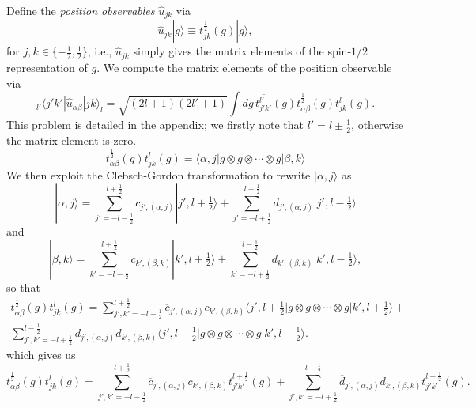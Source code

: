 \documentclass[12pt]{amsart}
\theoremstyle{definition}
\theoremstyle{remark}
\numberwithin{equation}{section}
\begin{document}
Define the \emph{position observables} $\widehat{u}_{jk}$ via
\begin{equation}
	\widehat{u}_{jk}|g\rangle \equiv t_{jk}^{\frac12}(g)|g\rangle,
\end{equation} 
for $j,k \in \{-\frac12, \frac12\}$, i.e., $\widehat{u}_{jk}$ simply gives the matrix elements of the spin-$1/2$ representation of $g$. We compute the matrix elements of the position observable via
\begin{equation}
	_{l'}\langle j'k'|\widehat{u}_{\alpha\beta}|jk\rangle_{l} = \sqrt{(2l+1)(2l'+1)}\int dg\, \overline{t^{l'}_{j'k'}}(g)t_{\alpha\beta}^{\frac12}(g) t_{jk}^{l}(g).
\end{equation}
This problem is detailed in the appendix; we firstly note that $l' = l\pm \frac12$, otherwise the matrix element is zero. 
\begin{equation}
	t_{\alpha\beta}^{\frac12}(g) t_{jk}^{l}(g) = \langle \alpha,j| g\otimes g \otimes \cdots \otimes g|\beta,k\rangle
\end{equation}
We then exploit the Clebsch-Gordon transformation to rewrite $|\alpha,j\rangle$ as
\begin{equation}
	|\alpha,j\rangle = \sum_{j' = -l-\frac12}^{l+\frac12} c_{j',(\alpha,j)} |j',l+\tfrac12\rangle + \sum_{j' = -l+\frac12}^{l-\frac12} d_{j',(\alpha,j)} |j',l-\tfrac12\rangle
\end{equation}
and
\begin{equation}
	|\beta,k\rangle = \sum_{k' = -l-\frac12}^{l+\frac12} c_{k',(\beta,k)} |k',l+\tfrac12\rangle + \sum_{k' = -l+\frac12}^{l-\frac12} d_{k',(\beta,k)} |k',l-\tfrac12\rangle,
\end{equation}
so that
\begin{multline}
		t_{\alpha\beta}^{\frac12}(g) t_{jk}^{l}(g) = \sum_{j',k' = -l-\frac12}^{l+\frac12} \overline{c}_{j',(\alpha,j)}c_{k',(\beta,k)} \langle j',l+\tfrac12| g \otimes g \otimes \cdots \otimes g |k',l+\tfrac12\rangle + \\
		\sum_{j',k' = -l+\frac12}^{l-\frac12} \overline{d}_{j',(\alpha,j)}d_{k',(\beta,k)} \langle j',l-\tfrac12|g \otimes g \otimes \cdots \otimes g|k',l-\tfrac12\rangle.
\end{multline}
which gives us
\begin{equation}
		t_{\alpha\beta}^{\frac12}(g) t_{jk}^{l}(g) = \sum_{j',k' = -l-\frac12}^{l+\frac12} \overline{c}_{j',(\alpha,j)}c_{k',(\beta,k)} t_{j'k'}^{l+\frac12}(g) +
		\sum_{j',k' = -l+\frac12}^{l-\frac12} \overline{d}_{j',(\alpha,j)}d_{k',(\beta,k)} t_{j'k'}^{l-\frac12}(g).
\end{equation}
\end{document}
